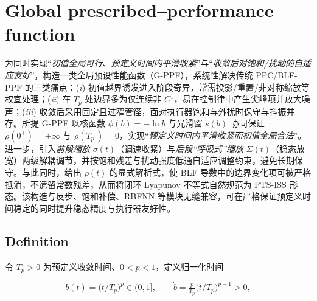 \documentclass[pdflatex,sn-mathphys-num]{sn-jnl}%
\theoremstyle{thmstyleone}%
\theoremstyle{thmstyletwo}%
\theoremstyle{thmstylethree}%
\begin{document}
\section{Global prescribed–performance function}

为同时实现“\emph{初值全局可行}、\emph{预定义时间内平滑收紧}”与“\emph{收敛后对饱和/扰动的自适应友好}”，构造一类全局预设性能函数（G-PPF），系统性解决传统 PPC/BLF-PPF 的三类痛点：(\emph{i}) 初值越界诱发进入阶段奇异，常需投影/重置/非对称缩放等权宜处理；(\emph{ii}) 在 $T_p$ 处边界多为仅连续非 $C^1$，易在控制律中产生尖峰项并放大噪声；(\emph{iii}) 收敛后采用固定且过窄管径，面对执行器饱和与外扰时保守与抖振并存。所提 G-PPF 以核函数 $\phi(b)=-\ln b$ 与光滑窗 $s(b)$ 协同保证 $\rho(0^+)=+\infty$ 与 $\dot\rho(T_p^-)=0$，实现“\emph{预定义时间内平滑收紧而初值全局合法}”。进一步，引入\emph{前段缩放} $\sigma(t)$（调速收紧）与\emph{后段“呼吸式”缩放} $\Sigma(t)$（稳态放宽）两级解耦调节，并按饱和残差与扰动强度低通自适应调整约束，避免长期保守。与此同时，给出 $\dot\rho(t)$ 的显式解析式，使 BLF 导数中的边界变化项可被严格抵消，不遗留常数残差，从而将闭环 Lyapunov 不等式自然规范为 PTS-ISS 形态。该构造与反步、饱和补偿、RBFNN 等模块无缝兼容，可在严格保证预定义时间稳定的同时提升稳态精度与执行器友好性。

\subsection{Definition}

令 $T_p>0$ 为预定义收敛时间、$0<p<1$，定义归一化时间

$$
b(t)=\bigl(t/T_p\bigr)^p\in(0,1],\qquad \dot b=\tfrac{p}{T_p}\bigl(t/T_p\bigr)^{p-1}>0,
$$
\end{document}

